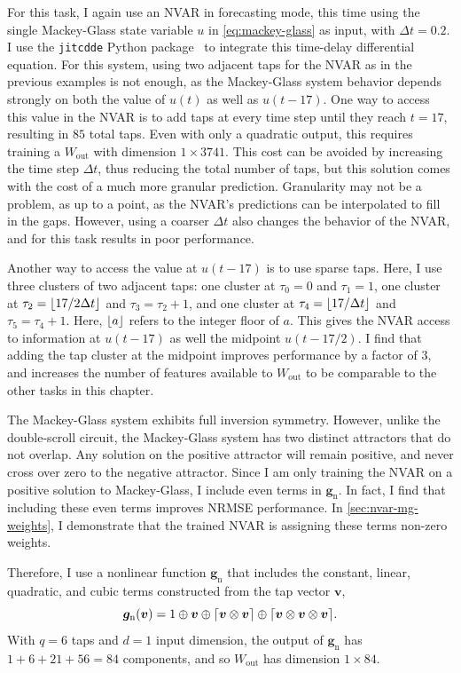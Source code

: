 For this task, I again use an NVAR in forecasting mode, this time
using the single Mackey-Glass state variable $u$ in
\cref{eq:mackey-glass} as input, with $\Delta t = 0.2$. I use the
\texttt{jitcdde} Python package~\cite{ansmann2018} to integrate this
time-delay differential equation. For this system, using two adjacent
taps for the NVAR as in the previous examples is not enough, as the
Mackey-Glass system behavior depends strongly on both the value of
$u(t)$ as well as $u(t - 17)$. One way to access this value in the
NVAR is to add taps at every time step until they reach $t = 17$,
resulting in $85$ total taps. Even with only a quadratic output, this
requires training a $W_\text{out}$ with dimension $1 \times
3741$. This cost can be avoided by increasing the time step $\Delta
t$, thus reducing the total number of taps, but this solution comes
with the cost of a much more granular prediction. Granularity may not
be a problem, as up to a point, as the NVAR's predictions can be
interpolated to fill in the gaps. However, using a coarser $\Delta t$
also changes the behavior of the NVAR, and for this task results in
poor performance.

Another way to access the value at $u(t-17)$ is to use sparse
taps. Here, I use three clusters of two adjacent taps: one cluster at
$\tau_0 = 0$ and $\tau_1 = 1$, one cluster at $\tau_2 = \lfloor17 / 2
  \Delta t\rfloor$ and $\tau_3 = \tau_2 + 1$, and one cluster at $\tau_4 =
\lfloor17 / \Delta t\rfloor$ and $\tau_5 = \tau_4 + 1$. Here, $\lfloor a\rfloor$ refers to the integer floor of $a$. This gives the NVAR
access to information at $u(t - 17)$ as well the midpoint $u(t -
17/2)$. I find that adding the tap cluster at the midpoint improves performance
by a factor of $3$, and increases the number of features available to
$W_\text{out}$ to be comparable to the other tasks in this chapter.

The Mackey-Glass system exhibits full inversion symmetry. However,
unlike the double-scroll circuit, the Mackey-Glass system has two
distinct attractors that do not overlap. Any solution on the positive
attractor will remain positive, and never cross over zero to the
negative attractor. Since I am only training the NVAR on a positive
solution to Mackey-Glass, I include even terms in $\bm{g}_\text{n}$. In
fact, I find that including these even terms improves NRMSE
performance. In \cref{sec:nvar-mg-weights}, I demonstrate that the trained NVAR is assigning these terms non-zero weights.

Therefore, I use a nonlinear function
$\bm{g}_\text{n}$ that includes the constant, linear, quadratic, and
cubic terms constructed from the tap vector $\bm{v}$,
\begin{equation}
  \bm{g}_\text{n}(\bm{v}) = 1 \oplus \bm{v} \oplus \lceil\bm{v} \otimes \bm{v}\rceil \oplus \lceil\bm{v} \otimes \bm{v} \otimes \bm{v}\rceil.
\end{equation}
With $q = 6$ taps and $d = 1$ input dimension, the output of $\bm{g}_\text{n}$
has $1 + 6 + 21 + 56 = 84$ components, and so $W_\text{out}$ has
dimension $1 \times 84$.

